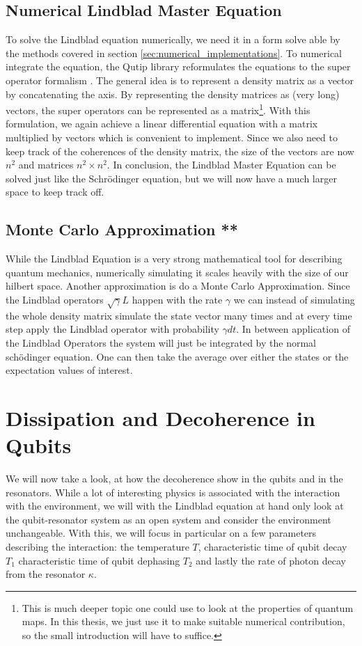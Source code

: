 \subsection{Numerical Lindblad Master Equation}
To solve the Lindblad equation numerically, we need it in a form solve able by the methods covered in section \ref{sec:numerical_implementations}. To numerical integrate the equation, the Qutip library reformulates the equations to the super operator formalism \cite{johansson_qutip_2012}. The general idea is to represent a density matrix as a vector by concatenating the axis. By representing the density matrices as (very long) vectors, the super operators can be represented as a matrix\footnote{This is much deeper topic one could use to look at the properties of quantum maps. In this thesis, we just use it to make suitable numerical contribution, so the small introduction will have to suffice. }. With this formulation, we again achieve a linear differential equation with a matrix multiplied by vectors which is convenient to implement. Since we also need to keep track of the coherences of the density matrix, the size of the vectors are now $n^2$ and matrices $n^2\times n^2$. In conclusion, the Lindblad Master Equation can be solved just like the Schrödinger equation, but we will now have a much larger space to keep track off. 

\subsection{Monte Carlo Approximation ** }\label{sec:monte_carlo}
While the Lindblad Equation is a very strong mathematical tool for describing quantum mechanics, numerically simulating it scales heavily with the size of our hilbert space. Another approximation is do a Monte Carlo Approximation. Since the Lindblad operators  $\sqrt{\gamma}L$ happen with the rate $\gamma$ we can instead of simulating the whole density matrix simulate the state vector many times and at every time step apply the Lindblad operator with probability $\gamma dt$. In between application of the Lindblad Operators the system will just be integrated by the normal schödinger equation. One can then take the average over either the states or the expectation values of interest.\cite{qutip}

\section{Dissipation and Decoherence in Qubits} \label{sec:qubit_lindblad}
We will now take a look, at how the decoherence show in the qubits and in the resonators. While a lot of interesting physics is associated with the interaction with the environment, we will with the Lindblad equation at hand only look at the qubit-resonator system as an open system and consider the environment unchangeable. With this, we will focus in particular on a few parameters describing the interaction: the temperature $T$, characteristic time of qubit decay $T_1$ characteristic time of qubit dephasing $T_2$ and lastly the rate of photon decay from the resonator $\kappa$.

